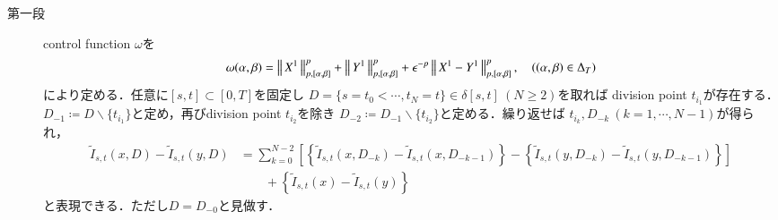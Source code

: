	\begin{prf}
		\begin{description}\mbox{}
			\item[第一段]
				control function $\omega$を
				\begin{align}
					\omega(\alpha,\beta) = \left\|\, X^1\, \right\|_{p,[\alpha,\beta]}^p + \left\|\, Y^1\, \right\|_{p,[\alpha,\beta]}^p + \epsilon^{-p} \left\|\, X^1 - Y^1\, \right\|_{p,[\alpha,\beta]}^p,
					\quad ((\alpha,\beta) \in \Delta_T)
				\end{align}
				により定める．任意に$[s,t] \subset [0,T]$を固定し
				$D = \{s=t_0 < \cdots, t_N=t\} \in \delta[s,t]\ (N \geq 2)$を取れば
				division point $t_{i_1}$が存在する．
				$D_{-1} \coloneqq D \backslash \{t_{i_1}\}$と定め，再びdivision point $t_{i_2}$を除き
				$D_{-2} \coloneqq D_{-1} \backslash \{t_{i_2}\}$と定める．繰り返せば
				$t_{i_k},D_{-k}\ (k=1,\cdots,N-1)$が得られ，
				\begin{align}
					\tilde{I}_{s,t}(x,D) - \tilde{I}_{s,t}(y,D)
					&= \sum_{k=0}^{N-2} \left[ \left\{ \tilde{I}_{s,t}(x,D_{-k}) - \tilde{I}_{s,t}(x,D_{-k-1}) \right\} - 
						\left\{ \tilde{I}_{s,t}(y,D_{-k}) - \tilde{I}_{s,t}(y,D_{-k-1}) \right\} \right] \label{eq:continuity_theorem_1_1}\\
					&\qquad + \left\{ \tilde{I}_{s,t}(x) - \tilde{I}_{s,t}(y) \right\}	\label{eq:continuity_theorem_1_2}
				\end{align}
				と表現できる．ただし$D = D_{-0}$と見做す．
			

\end{description}
\end{prf}
